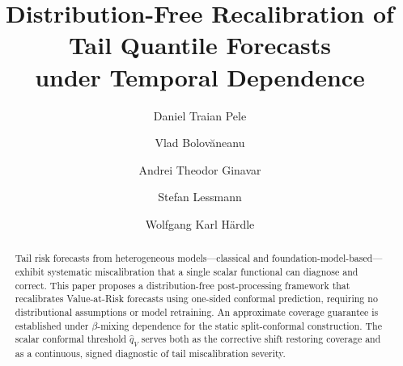 \documentclass[preprint,11pt,authoryear]{elsarticle}
\newcommand{\1}{\boldsymbol{1}}
\begin{document}
	
	\begin{frontmatter}
		
		\title{Distribution-Free Recalibration of Tail Quantile Forecasts\\
			under Temporal Dependence}
		
		\author[1,2,3]{Daniel Traian Pele}
		
		\author[1]{Vlad Bolov\u{a}neanu}
		
		\author[1]{Andrei Theodor Ginavar}
		
		
		\author[1,4]{Stefan Lessmann}
		
		\author[1,3,4,5,6]{Wolfgang Karl H{\"a}rdle}
		
		
		
		
		
		
		\begin{abstract}
			Tail risk forecasts from heterogeneous models---classical and foundation-model-based---exhibit systematic miscalibration that a single scalar functional can diagnose and correct. This paper proposes a distribution-free post-processing framework that recalibrates Value-at-Risk forecasts using one-sided conformal prediction, requiring no distributional assumptions or model retraining. An approximate coverage guarantee is established under $\beta$-mixing dependence for the static split-conformal construction. The scalar conformal threshold $\hat{q}_V$ serves both as the corrective shift restoring coverage and as a continuous, signed diagnostic of tail miscalibration severity.


\end{abstract}
\end{frontmatter}
\end{document}

